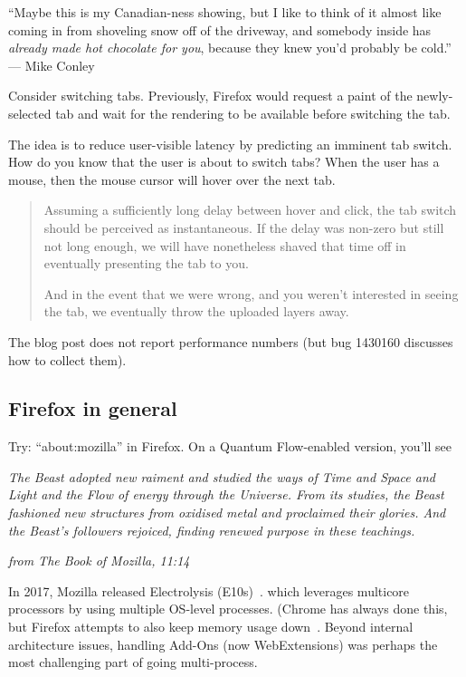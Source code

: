 \documentclass[a4paper]{report}
\begin{document}
\hfill ``Maybe this is my Canadian-ness showing, but I like to think of it almost like coming in from shoveling snow off of the driveway, and somebody inside has \emph{already made hot chocolate for you}, because they knew you’d probably be cold.'' --- Mike Conley

Consider switching tabs. Previously, Firefox would request a paint of the newly-selected tab and wait for the rendering to be available before switching the tab.

The idea is to reduce user-visible latency by predicting an imminent tab switch. How do you know that the user is about to switch tabs? When the user has a mouse, then the mouse cursor will hover over the next tab.

\begin{quote}
Assuming a sufficiently long delay between hover and click, the tab switch should be perceived as instantaneous. If the delay was non-zero but still not long enough, we will have nonetheless shaved that time off in eventually presenting the tab to you.

And in the event that we were wrong, and you weren’t interested in seeing the tab, we eventually throw the uploaded layers away.
\end{quote}

The blog post does not report performance numbers (but bug 1430160 discusses how to collect them).

\subsection*{Firefox in general}

Try: ``about:mozilla'' in Firefox. On a Quantum Flow-enabled version, you'll see

\begin{center}
\emph{The Beast adopted new raiment and studied the ways of Time and Space and Light and the Flow of energy through the Universe. From its studies, the Beast fashioned new structures from oxidised metal and proclaimed their glories. And the Beast’s followers rejoiced, finding renewed purpose in these teachings.}

\hfill \emph{from The Book of Mozilla, 11:14}
\end{center}

In 2017, Mozilla released Electrolysis (E10s)~\cite{electrolysis}.
which leverages multicore processors by using multiple OS-level
processes. (Chrome has always done this, but Firefox attempts to also
keep memory usage
down~\cite{goldilocks}.
Beyond internal architecture issues, handling Add-Ons (now
WebExtensions) was perhaps the most challenging part of going
multi-process.
\end{document}
